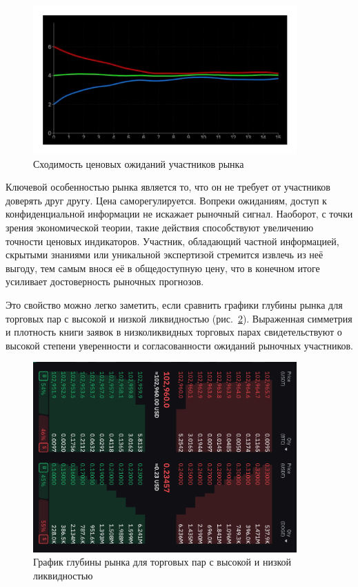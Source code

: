 \documentclass[
    14pt,
    specialist,
    candidate, %
    subf, %
    href,
    dotsinheaders=false
]{disser}
\begin{document}
\begin{figure}[H]
  \centering
  \includegraphics[width=0.9\textwidth]{./assets/one-price.png}
  \caption{Сходимость ценовых ожиданий участников рынка}
  \label{fig:one-price}
\end{figure}

Ключевой особенностью рынка является то, что он не требует от участников доверять друг другу. Цена саморегулируется. Вопреки ожиданиям, доступ к конфиденциальной информации не искажает рыночный сигнал. Наоборот, с точки зрения экономической теории, такие действия способствуют увеличению точности ценовых индикаторов. Участник, обладающий частной информацией, скрытыми знаниями или уникальной экспертизой стремится извлечь из неё выгоду, тем самым внося её в общедоступную цену, что в конечном итоге усиливает достоверность рыночных прогнозов.

Это свойство можно легко заметить, если сравнить графики глубины рынка для торговых пар с высокой и низкой ликвидностью (рис.~\ref{fig:limit-order}). Выраженная симметрия и плотность книги заявок в низколиквидных торговых парах свидетельствуют о высокой степени уверенности и согласованности ожиданий рыночных участников.

\begin{figure}[H]
  \centering
  \includegraphics[width=0.9\textwidth]{./assets/limit-order.png}
  \caption{График глубины рынка для торговых пар с высокой и низкой ликвидностью}
  \label{fig:limit-order}
\end{figure}
\end{document}
